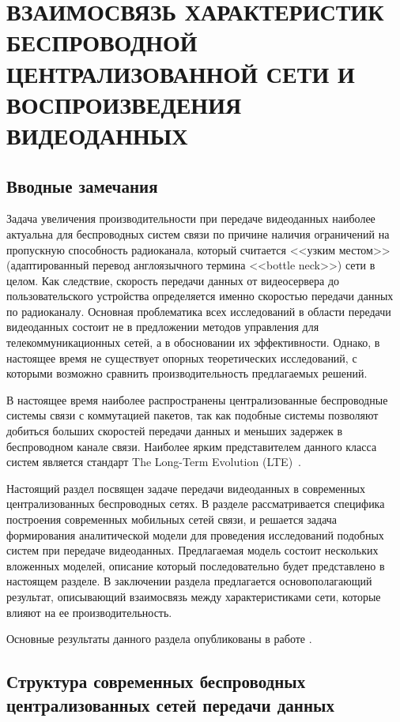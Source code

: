 \chapter{ВЗАИМОСВЯЗЬ ХАРАКТЕРИСТИК БЕСПРОВОДНОЙ ЦЕНТРАЛИЗОВАННОЙ СЕТИ И ВОСПРОИЗВЕДЕНИЯ ВИДЕОДАННЫХ}
\label{chap2}

\section{Вводные замечания}
\label{chap2:Intro}

Задача увеличения производительности при передаче видеоданных наиболее актуальна для беспроводных систем связи по причине наличия ограничений на пропускную способность радиоканала, который считается <<узким местом>> (адаптированный перевод англоязычного термина <<bottle neck>>) сети в целом. Как следствие, скорость передачи данных от видеосервера до пользовательского устройства определяется именно скоростью передачи данных по радиоканалу. Основная проблематика всех исследований в области передачи видеоданных состоит не в предложении методов управления для телекоммуникационных сетей, а в обосновании их эффективности. Однако, в настоящее время не существует опорных теоретических исследований, с которыми возможно сравнить производительность предлагаемых решений.

В настоящее время наиболее распространены централизованные беспроводные системы связи с коммутацией пакетов, так как подобные системы позволяют добиться больших скоростей передачи данных и меньших задержек в беспроводном канале связи. Наиболее ярким представителем данного класса систем является стандарт The Long-Term Evolution (LTE)~\cite{opac-b1130916}.

Настоящий раздел посвящен задаче передачи видеоданных в современных централизованных беспроводных сетях. В разделе рассматривается специфика построения современных мобильных сетей связи, и решается задача формирования аналитической модели для проведения исследований подобных систем при передаче видеоданных. Предлагаемая модель состоит нескольких вложенных моделей, описание который последовательно будет представлено в настоящем разделе. В заключении раздела предлагается основополагающий результат, описывающий взаимосвязь между характеристиками сети, которые влияют на ее производительность.

Основные результаты данного раздела опубликованы в работе \cite{past_poly}.

\section{Структура современных беспроводных централизованных сетей передачи данных}
\label{chap2:WirelessSystemStructure}

